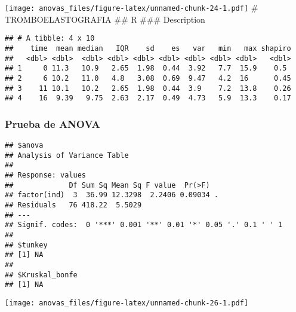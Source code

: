 \documentclass[
]{article}
\begin{document}
\texttt{[image: anovas\_files/figure-latex/unnamed-chunk-24-1.pdf]} \#
TROMBOELASTOGRAFIA \#\# R \#\#\# Description

\begin{verbatim}
## # A tibble: 4 x 10
##    time  mean median   IQR    sd    es   var   min   max shapiro
##   <dbl> <dbl>  <dbl> <dbl> <dbl> <dbl> <dbl> <dbl> <dbl>   <dbl>
## 1     0 11.3   10.9   2.65  1.98  0.44  3.92   7.7  15.9    0.5 
## 2     6 10.2   11.0   4.8   3.08  0.69  9.47   4.2  16      0.45
## 3    11 10.1   10.2   2.65  1.98  0.44  3.9    7.2  13.8    0.26
## 4    16  9.39   9.75  2.63  2.17  0.49  4.73   5.9  13.3    0.17
\end{verbatim}

\hypertarget{prueba-de-anova-12}{%
\subsubsection{Prueba de ANOVA}\label{prueba-de-anova-12}}

\begin{verbatim}
## $anova
## Analysis of Variance Table
## 
## Response: values
##             Df Sum Sq Mean Sq F value  Pr(>F)  
## factor(ind)  3  36.99 12.3298  2.2406 0.09034 .
## Residuals   76 418.22  5.5029                  
## ---
## Signif. codes:  0 '***' 0.001 '**' 0.01 '*' 0.05 '.' 0.1 ' ' 1
## 
## $tunkey
## [1] NA
## 
## $Kruskal_bonfe
## [1] NA
\end{verbatim}

\texttt{[image: anovas\_files/figure-latex/unnamed-chunk-26-1.pdf]}
\end{document}
